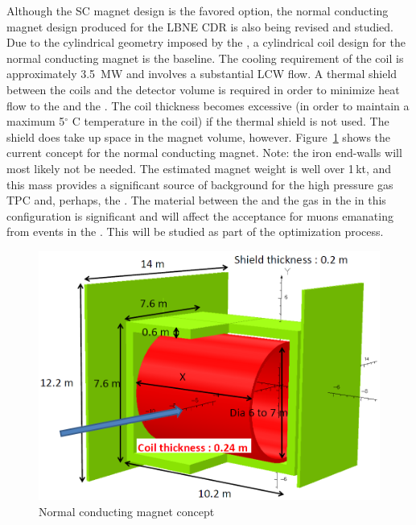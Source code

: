 Although the SC magnet design is the favored option, the normal conducting magnet design produced for the LBNE CDR is also being revised and studied.  Due to the cylindrical geometry imposed by the , a cylindrical coil design for the normal conducting magnet is the baseline. The cooling requirement of the coil is approximately \SI{3.5}{MW} and involves a substantial LCW flow. A thermal shield between the coils and the detector volume is required in order to minimize heat flow to the  and the . The coil thickness becomes excessive (in order to maintain a maximum 5$^\circ$ C temperature in the coil) if the thermal shield is not used.  The shield does take up space in the magnet volume, however.  Figure~\ref{fig:dune_nd_magnet_nc_layout} shows the current concept for the normal conducting magnet.  Note: the iron end-walls will most likely not be needed. The estimated magnet weight is well over 1\,kt, and this mass provides a significant source of background for the high pressure gas TPC and, perhaps, the .  The material between the  and the gas  in the  in this configuration is significant and will affect the acceptance for muons emanating from events in the . This will be studied as part of the optimization process.
%
\begin{figure}[h]
\centering 
\includegraphics[width=0.95\columnwidth]{graphics/dune_nd_magnet_nc_layout.png} 
\caption{Normal conducting magnet concept} 
\label{fig:dune_nd_magnet_nc_layout} 
\end{figure}
%




